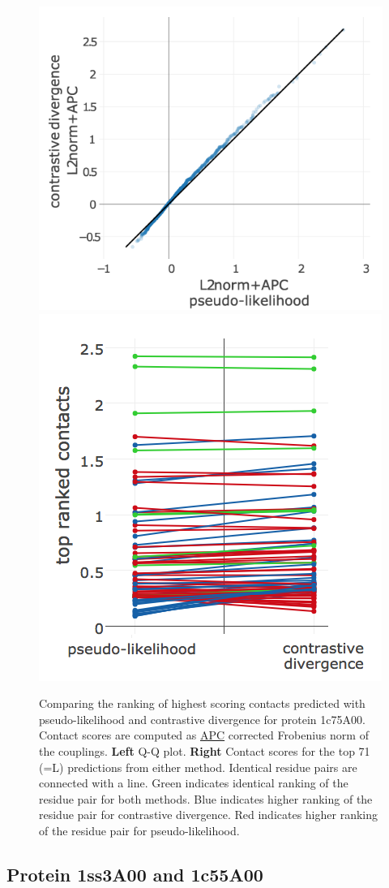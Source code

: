 \documentclass[11pt,a4paper,twoside]{book}
\theoremstyle{definition}
\theoremstyle{definition}
\theoremstyle{remark}
\begin{document}
\begin{figure}

{\centering \includegraphics[width=0.48\linewidth]{img/full_likelihood/comparing_couplings/1c75A00/qq_plot_for_pseudo-likelihoodvs_contrastive_divergence_apc_1c75A00} \includegraphics[width=0.48\linewidth]{img/full_likelihood/comparing_couplings/1c75A00/comparative_value_top_ranked_contacts_for_1c75A00_method1_pseudo-likelihood_method2_contrastive_divergence_seqsep8} 

}

\caption{Comparing the ranking of highest
scoring contacts predicted with pseudo-likelihood and contrastive
divergence for protein 1c75A00. Contact scores are computed as
\protect\hyperlink{abbrev}{APC} corrected Frobenius norm of the
couplings. \textbf{Left} Q-Q plot. \textbf{Right} Contact scores for the
top 71 (=L) predictions from either method. Identical residue pairs are
connected with a line. Green indicates identical ranking of the residue
pair for both methods. Blue indicates higher ranking of the residue pair
for contrastive divergence. Red indicates higher ranking of the residue
pair for pseudo-likelihood.}\label{fig:ranking-pll-cd-1c75a00}
\end{figure}

\subsection{Protein 1ss3A00 and
1c55A00}\label{protein-1ss3a00-and-1c55a00}
\end{document}
